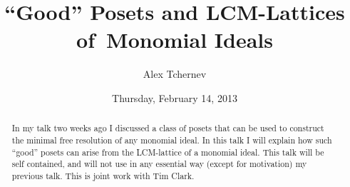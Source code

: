 \documentclass{UAmathtalk}
\author{Alex Tchernev}
\title{``Good'' Posets and LCM-Lattices of~Monomial Ideals}
\date{Thursday, February 14, 2013}
\begin{document}
\maketitle

\begin{abstract}
In my talk two weeks ago I discussed a class of posets that can be used to construct the minimal free resolution of any monomial ideal.  In this talk I will explain how such ``good'' posets can arise from the LCM-lattice of a monomial ideal. This talk will be self contained, and will not use in any essential way (except for motivation) my previous talk. This is joint work with Tim Clark.
\end{abstract}
\end{document}
